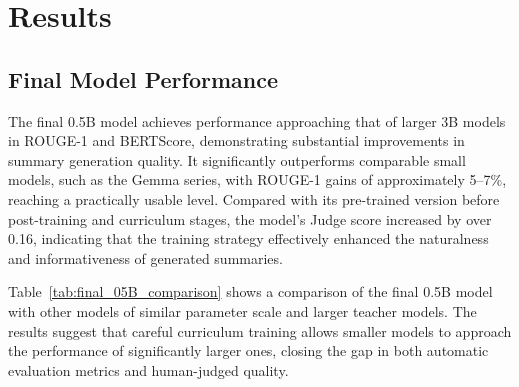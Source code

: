 
\chapter{Results}

\section{Final Model Performance}
The final 0.5B model achieves performance approaching that of larger 3B models in ROUGE-1 and BERTScore, demonstrating substantial improvements in summary generation quality. It significantly outperforms comparable small models, such as the Gemma series, with ROUGE-1 gains of approximately 5–7\%, reaching a practically usable level. Compared with its pre-trained version before post-training and curriculum stages, the model’s Judge score increased by over 0.16, indicating that the training strategy effectively enhanced the naturalness and informativeness of generated summaries.

Table~\ref{tab:final_05B_comparison} shows a comparison of the final 0.5B model with other models of similar parameter scale and larger teacher models. The results suggest that careful curriculum training allows smaller models to approach the performance of significantly larger ones, closing the gap in both automatic evaluation metrics and human-judged quality.


\begin{center}
    \label{tab:final_05B_comparison}
\end{center}


